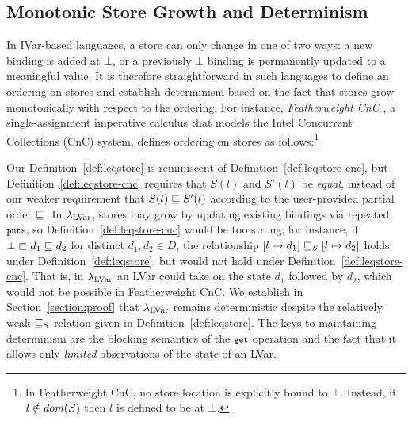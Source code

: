 \subsection{Monotonic Store Growth and Determinism}\label{subsection:monotonicity}

In IVar-based languages, a store can only change
in one of two ways: a new binding is added at $\bot$, or a
previously $\bot$ binding is permanently updated to a meaningful value.
It is therefore straightforward in such languages
to define an ordering on stores and establish determinism based on the
fact that stores grow monotonically with respect to the ordering. For
instance, \emph{Featherweight CnC} \cite{CnC}, a single-assignment 
imperative calculus that models the Intel Concurrent Collections (CnC)
system, defines ordering on stores as follows:\footnote{In
  Featherweight CnC, 
  no store location is explicitly bound to $\bot$.
  Instead, if $l \notin \mathit{dom}(S)$ then $l$ is defined to be at
  $\bot$. %
}

\DefLeqStoreCnC

\noindent 
Our Definition~\ref{def:leqstore} is reminiscent of
Definition~\ref{def:leqstore-cnc}, but Definition~\ref{def:leqstore-cnc}
requires that $S(l)$ and $S'(l)$
be \emph{equal}, instead of our weaker
requirement that $S(l) \sqsubseteq S'(l)$ according to the user-provided
partial order $\sqsubseteq$.  In $\textup{\ensuremath{\lambda_{\textrm{LVar}}}}$, stores may grow by updating
existing bindings via repeated $\mbox{\footnotesize \texttt{put}}$s, so
Definition~\ref{def:leqstore-cnc} would be too strong; for instance,
if $\bot \sqsubset d_1 \sqsubseteq d_2$ for distinct $d_1, d_2 \in D$, the relationship
$\left[ l \mapsto d_1 \right] \sqsubseteq_S \left[ l \mapsto d_2 \right]$
holds under Definition~\ref{def:leqstore}, but would not hold under
Definition~\ref{def:leqstore-cnc}.  That is, in $\textup{\ensuremath{\lambda_{\textrm{LVar}}}}$ an LVar
could take on the state $d_1$ followed by $d_2$, which would not be
possible in Featherweight CnC.  We establish in
Section~\ref{section:proof} that $\textup{\ensuremath{\lambda_{\textrm{LVar}}}}$ remains
deterministic despite the relatively weak $ \sqsubseteq_S $
relation given in Definition~\ref{def:leqstore}.  The keys to
maintaining determinism are the blocking semantics of the $\mbox{\footnotesize \texttt{get}}$
operation and the fact that it allows only \emph{limited} observations
of the state of an LVar.


